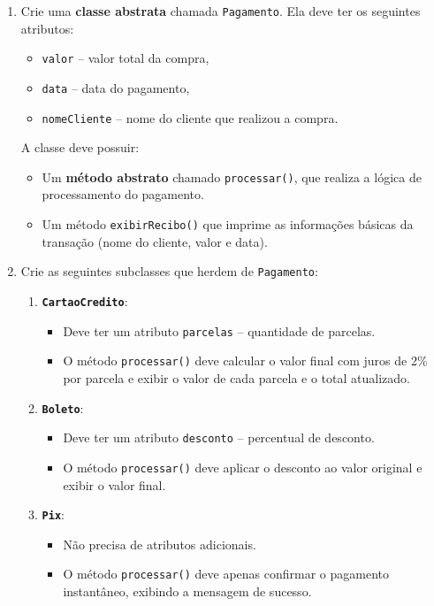 \documentclass{article}
\begin{document}
\begin{enumerate}
    \item Crie uma \textbf{classe abstrata} chamada \texttt{Pagamento}.  
    Ela deve ter os seguintes atributos:
    \begin{itemize}
        \item \texttt{valor} -- valor total da compra,
        \item \texttt{data} -- data do pagamento,
        \item \texttt{nomeCliente} -- nome do cliente que realizou a compra.
    \end{itemize}

    A classe deve possuir:
    \begin{itemize}
        \item Um \textbf{método abstrato} chamado \texttt{processar()}, que realiza a lógica de processamento do pagamento.
        \item Um método \texttt{exibirRecibo()} que imprime as informações básicas da transação (nome do cliente, valor e data).
    \end{itemize}

    \item Crie as seguintes subclasses que herdem de \texttt{Pagamento}:
    \begin{enumerate}
        \item \textbf{\texttt{CartaoCredito}}:
        \begin{itemize}
            \item Deve ter um atributo \texttt{parcelas} -- quantidade de parcelas.
            \item O método \texttt{processar()} deve calcular o valor final com juros de 2\% por parcela e exibir o valor de cada parcela e o total atualizado.
        \end{itemize}

        \item \textbf{\texttt{Boleto}}:
        \begin{itemize}
            \item Deve ter um atributo \texttt{desconto} -- percentual de desconto.
            \item O método \texttt{processar()} deve aplicar o desconto ao valor original e exibir o valor final.
        \end{itemize}

        \item \textbf{\texttt{Pix}}:
        \begin{itemize}
            \item Não precisa de atributos adicionais.
            \item O método \texttt{processar()} deve apenas confirmar o pagamento instantâneo, exibindo a mensagem de sucesso.
        \end{itemize}
    \end{enumerate}


\end{enumerate}
\end{document}
